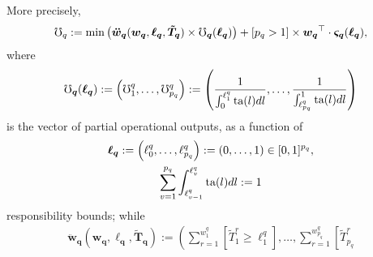 \documentclass[hidelinks, nonatbib]{elsarticle}
\begin{document}
\begin{axiom}
\begin{subaxiom}
    More precisely,
    \begin{gather}
        \mho_q
        :=
        \min\left(
            \boldsymbol{\ddot{w}_{q}}(
                \boldsymbol{w_{q}},
                \boldsymbol{\ell_{q}},
                \boldsymbol{\tilde{T}_{q}}
            )
            \times
            \boldsymbol{\mho_{q}}(
                \boldsymbol{\ell_{q}}
            )
        \right)
        +
        [p_q > 1]
        \times
        \boldsymbol{w_{q}} ^ {\top}
        \cdot 
        \boldsymbol{\varsigma_{q}}(
            \boldsymbol{\ell_{q}}
        )
        ,
    \end{gather}
    where
    \begin{gather}
        \boldsymbol{\mho_{q}}(
            \boldsymbol{\ell_{q}}
        )
        :=
        \left(
            \mho_{1}^{q}
            ,
            \dots
            ,
            \mho_{p_q}^{q}
        \right)
        :=
        \left(
            \frac{1}{
                \int_{0}^{\ell_{1}^{q}}
                \text{ta}(l)dl
            }
            ,
            \dots
            ,
            \frac{1}{
                \int_{\ell_{p_q}^{q}}^{1}
                \text{ta}(l)dl
            }
        \right)
    \end{gather}
    is the vector of partial operational outputs, as a function of
    \begin{gather}
        \boldsymbol{\ell_q}
        :=
        \left(
            \ell_{0}^{q}
            ,
            \dots
            ,
            \ell_{p_q}^{q}
        \right)
        :=
        \left(
            0
            ,
            \dots
            ,
            1
        \right)
        \in
        [0,1] ^ {p_q}
        ,
        \\
        \sum_{v=1}^{p_q}{
            \int_{
                \ell_{v-1}^{q}
            }^{
                \ell_{v}^{q}
            }
            \text{ta}(l)dl
        }
        :=
        1
    \end{gather}
    responsibility bounds; while
    \begin{gather}
        \boldsymbol{\ddot{w}_{q}}(
            \boldsymbol{w_{q}},
            \boldsymbol{\ell_{q}},
            \boldsymbol{\tilde{T}_{q}}
        )
        :=
        \left(
            \sum_{r=1}^{w_{1}^{q}}
            \left[
                \tilde{T}_{1}^{r}
                \geq
                \ell_{1}^{q}
            \right]
            ,
            \dots
            ,
            \sum_{r=1}^{w_{p_q}^{q}}
            \left[
                \tilde{T}_{p_q}^{r}

\end{gather}
\end{subaxiom}
\end{axiom}
\end{document}
